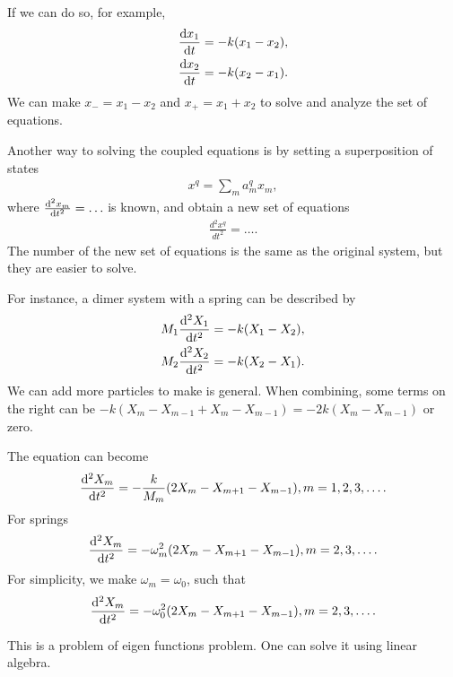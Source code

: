 If we can do so, for example,
\begin{align}
\frac{{\mathrm d} {x_1}}{{\mathrm d}t} &= -k(x_1-x_2),\\
\frac{{\mathrm d} {x_2}}{{\mathrm d}t} &= -k(x_2-x_1).
\end{align}
We can make $ x_- = x_1 - x_2 $ and $ x_+ = x_1+x_2 $ to solve and analyze the set of equations.

Another way to solving the coupled equations is by setting a superposition of states
\begin{align}
x^q= \sum_m a_m^q x_m,
\end{align}
where $ \frac{{\mathrm d}^2 {x_m}}{{\mathrm d}t^2}=\ldots $ is known, 
and obtain a new set of equations
\begin{align}
\frac{d^2 x^q}{dt^2}=\ldots.
\end{align}
The number of the new set of equations is the same as the original system, but they are easier to solve. 

For instance, a dimer system with a spring can be described by
\begin{align}
M_1 \frac{{\mathrm d}^2 {X_1}}{{\mathrm d}t^2}= -k (X_1- X_2),\\
M_2 \frac{{\mathrm d}^2 {X_2}}{{\mathrm d}t^2}= -k (X_2- X_1).
\end{align}
We can add more particles to make is general. When combining, some terms on the right can be
$ -k (X_m-X_{m-1} +X_m-X_{m-1}) = -2k (X_m-X_{m-1})$ or zero. 

The equation can become
\begin{align}
\frac{{\mathrm d}^2 {X_m}}{{\mathrm d}t^2}=-\frac{k}{M_m} (2 X_m- X_{m+1}-X_{m-1}), m=1,2,3,\ldots.
\end{align}
For springs
\begin{align}
\frac{{\mathrm d}^2 {X_m}}{{\mathrm d}t^2}=-{\omega^2_m} (2 X_m- X_{m+1}-X_{m-1}), m=2,3,\ldots.
\end{align}
For simplicity, we make $ \omega_m=\omega_0 $, such that
\begin{align}
\frac{{\mathrm d}^2 {X_m}}{{\mathrm d}t^2}=-{\omega^2_0} (2 X_m- X_{m+1}-X_{m-1}), m=2,3,\ldots.
\end{align}

This is a problem of eigen functions problem. One can solve it using linear algebra. 

